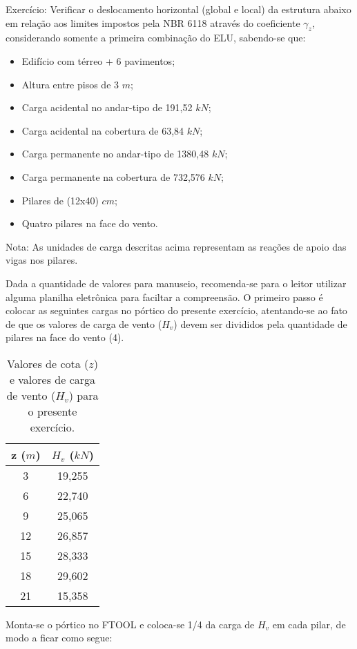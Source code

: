 Exercício: Verificar o deslocamento horizontal (global e local) da estrutura abaixo em relação aos limites impostos pela NBR 6118 através do coeficiente $\gamma_z$, considerando somente a primeira combinação do ELU, sabendo-se que:

\begin{itemize}
	\item Edifício com térreo + 6 pavimentos;
	\item Altura entre pisos de 3 $m$;
	\item Carga acidental no andar-tipo de 191,52 $kN$;
	\item Carga acidental na cobertura de 63,84 $kN$;
	\item Carga permanente no andar-tipo de 1380,48 $kN$;
	\item Carga permanente na cobertura de 732,576 $kN$;
	\item Pilares de (12x40) $cm$;
	\item Quatro pilares na face do vento.
\end{itemize}

Nota: As unidades de carga descritas acima representam as reações de apoio das vigas nos pilares.

Dada a quantidade de valores para manuseio, recomenda-se para o leitor utilizar alguma planilha eletrônica para faciltar a compreensão. O primeiro passo é colocar as seguintes cargas no pórtico do presente exercício, atentando-se ao fato de que os valores de carga de vento ($H_v$) devem ser divididos pela quantidade de pilares na face do vento (4).

\begin{table}[H]
	\centering
	\caption{Valores de cota ($z$) e valores de carga de vento ($H_v$) para o presente exercício.}
	\begin{tabular}{c|c}
	\hline
	z ($m$) & $H_v$ ($kN$) \\ \hline
	3       & 19,255       \\
	6       & 22,740       \\
	9       & 25,065       \\
	12      & 26,857       \\
	15      & 28,333       \\
	18      & 29,602       \\
	21      & 15,358       \\ \hline
	\end{tabular}
\end{table}

Monta-se o pórtico no FTOOL e coloca-se 1/4 da carga de $H_v$ em cada pilar, de modo a ficar como segue:

